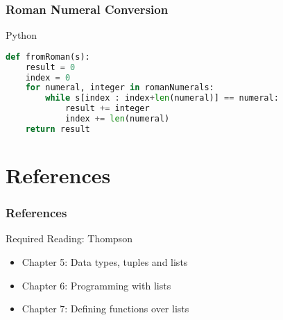 \documentclass[dvipsnames]{beamer}
\theoremstyle{plain}
\begin{document}
\begin{frame}[fragile]
  \frametitle{Roman Numeral Conversion}

  \begin{exampleblock}{Python}
    \begin{lstlisting}[language=Python]
def fromRoman(s):
    result = 0
    index = 0
    for numeral, integer in romanNumerals:
        while s[index : index+len(numeral)] == numeral:
            result += integer
            index += len(numeral)
    return result
    \end{lstlisting}
  \end{exampleblock}
\end{frame}

\section*{References}

\begin{frame}
  \frametitle{References}

  \begin{block}{Required Reading: Thompson}
    \begin{itemize}
      \item Chapter 5: \alert{Data types, tuples and lists}
      \item Chapter 6: \alert{Programming with lists}
      \item Chapter 7: \alert{Defining functions over lists}
    \end{itemize}
  \end{block}
\end{frame}
\end{document}
